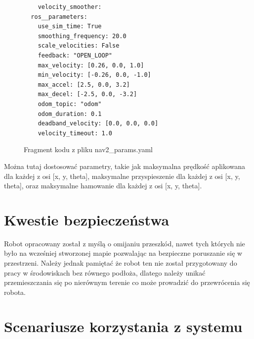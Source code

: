 \documentclass[a4paper,twoside,12pt]{book}
\begin{document}
\begin{figure}[!hb]
	\centering
\begin{lstlisting}
	velocity_smoother:
  ros__parameters:
    use_sim_time: True
    smoothing_frequency: 20.0
    scale_velocities: False
    feedback: "OPEN_LOOP"
    max_velocity: [0.26, 0.0, 1.0]
    min_velocity: [-0.26, 0.0, -1.0]
    max_accel: [2.5, 0.0, 3.2]
    max_decel: [-2.5, 0.0, -3.2]
    odom_topic: "odom"
    odom_duration: 0.1
    deadband_velocity: [0.0, 0.0, 0.0]
    velocity_timeout: 1.0
\end{lstlisting}
\caption{Fragment kodu z pliku nav2\_params.yaml}
\label{fig:nav-predkosc}
\end{figure}
Można tutaj dostosować parametry, takie jak maksymalna prędkość aplikowana dla każdej z osi [x, y, theta], maksymalne przyspieszenie dla każdej z osi [x, y, theta], oraz maksymalne hamowanie dla każdej z osi [x, y, theta].
\newpage
\section{Kwestie bezpieczeństwa}
Robot opracowany został z myślą o omijaniu przeszkód, nawet tych których nie było na wcześniej stworzonej mapie pozwalając na bezpieczne poruszanie się w przestrzeni.
Należy jednak pamiętać że robot ten nie został przygotowany do pracy w środowiskach bez równego podłoża, dlatego należy unikać przemieszczania się po nierównym terenie co może prowadzić do przewrócenia się robota.

\section{Scenariusze korzystania z systemu}
\end{document}
